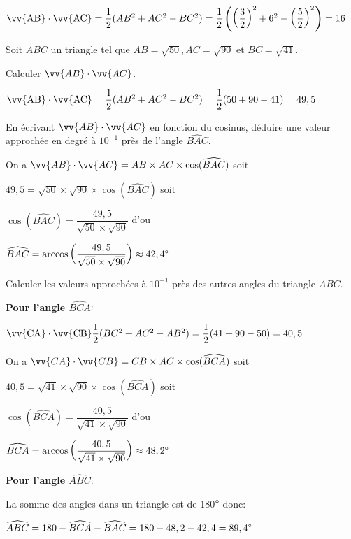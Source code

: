 \documentclass[11pt,a4paper]{article}  %
\begin{document}
\begin{corrBox}
	$\vv{\mathrm{AB}} \cdot \vv{\mathrm{AC}}=\dfrac{1}{2}(AB^2+AC^2-BC^2)=\dfrac{1}{2}\left(\left(\dfrac{3}{2}\right)^2+6^2-\left(\dfrac{5}{2}\right)^2\right)=16$	
\end{corrBox}

\exercice{}

Soit $A B C$ un triangle tel que $A B=\sqrt{50}, A C=\sqrt{90}$ et $B C=\sqrt{41}$.
\begin{enumMet}
	\item \begin{enumMet}
		\item Calculer $\vv{A B} \cdot \vv{A C}$.
		\begin{corrBox}
			$\vv{\mathrm{AB}} \cdot \vv{\mathrm{AC}}=\dfrac{1}{2}(AB^2+AC^2-BC^2)=\dfrac{1}{2}(50+90-41)=49,5$	
		\end{corrBox}
		\item En écrivant $\vv{A B} \cdot \vv{A C}$ en fonction du cosinus, déduire une valeur approchée en degré à $10^{-1}$ près de l'angle $\widehat{B A C}$.
		\begin{corrBox}
			On a $\vv{A B} \cdot \vv{A C}=AB\times AC\times \cos(\widehat{BAC})$ soit
			
			$49,5=\sqrt{50}\times \sqrt{90}\times \cos(\widehat{BAC})$ soit
			
			$\cos(\widehat{BAC})=\dfrac{49,5}{\sqrt{50}\times \sqrt{90}}$ d'ou
			
			$\widehat{BAC}=\arccos\left(\dfrac{49,5}{\sqrt{50}\times \sqrt{90}}\right)\approx42,4\degree$		
		\end{corrBox}
	\end{enumMet}
	\item Calculer les valeurs approchées à $10^{-1}$ près des autres angles du triangle $A B C$.
	\begin{corrBox}
		\textbf{Pour l'angle $\widehat{BCA}$}:
		
		$\vv{\mathrm{CA}} \cdot \vv{\mathrm{CB}}\dfrac{1}{2}(BC^2+AC^2-AB^2)=\dfrac{1}{2}(41+90-50)=40,5$
		
		On a $\vv{CA} \cdot \vv{CB}=CB\times AC\times \cos(\widehat{BCA})$ soit
		
		$40,5=\sqrt{41}\times \sqrt{90}\times \cos(\widehat{BCA})$ soit
		
		$\cos(\widehat{BCA})=\dfrac{40,5}{\sqrt{41}\times \sqrt{90}}$ d'ou
		
		$\widehat{BCA}=\arccos\left(\dfrac{40,5}{\sqrt{41}\times \sqrt{90}}\right)\approx48,2\degree$
		
		\textbf{Pour l'angle $\widehat{ABC}$}:
		
		La somme des angles dans un triangle est de 180$\degree$ donc:
		
		$\widehat{ABC}=180-\widehat{BCA}-\widehat{BAC}=180-48,2-42,4=89,4\degree$			
	\end{corrBox}
\end{enumMet}
\end{document}
